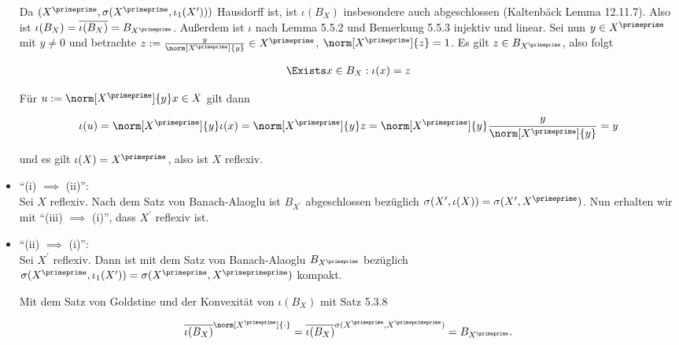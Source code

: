 \begin{solution}
\begin{itemize}

  Da $(X^\primeprime, \sigma(X^\primeprime, \iota_1(X^\prime)))$ Hausdorff ist, ist $\iota(B_X)$ insbesondere auch abgeschlossen (Kaltenbäck Lemma 12.11.7).
  Also ist $\iota(B_X) = \overline{\iota(B_X)} = B_{X^\primeprime}$.
  Außerdem ist $\iota$ nach Lemma 5.5.2 und Bemerkung 5.5.3 injektiv und linear.
  Sei nun $y \in X^\primeprime$ mit $y \neq 0$ und betrachte $z := \frac{y}{\norm[X^\primeprime]{y}} \in X^\primeprime$, $\norm[X^\primeprime]{z} = 1$.
  Es gilt $z \in B_{X^\primeprime}$, also folgt

  \begin{align*}
    \Exists x \in B_X:
    \iota(x) = z
  \end{align*}

  Für $u := \norm[X^\primeprime]{y} x \in X$ gilt dann

  \begin{align*}
    \iota(u)
    =
    \norm[X^\primeprime]{y} \iota(x)
    =
    \norm[X^\primeprime]{y} z
    =
    \norm[X^\primeprime]{y} \frac{y}{\norm[X^\primeprime]{y}}
    = y
  \end{align*}

  und es gilt $\iota(X) = X^\primeprime$, also ist $X$ reflexiv.

  \item
  \enquote{(i) $\implies$ (ii)}: \\

  Sei $X$ reflexiv.
  Nach dem Satz von Banach-Alaoglu ist $B_{X^\prime}$ abgeschlossen bezüglich $\sigma(X^\prime, \iota(X)) = \sigma(X^\prime, X^\primeprime)$.
  Nun erhalten wir mit \enquote{(iii) $\implies$ (i)}, dass $X^\prime$ reflexiv ist.

  \item
  \enquote{(ii) $\implies$ (i)}: \\

  Sei $X^\prime$ reflexiv.
  Dann ist mit dem Satz von Banach-Alaoglu $B_{X^\primeprime}$ bezüglich $\sigma(X^\primeprime, \iota_1(X^\prime)) = \sigma(X^\primeprime, X^\primeprimeprime)$ kompakt.


  Mit dem Satz von Goldstine und der Konvexität von $\iota(B_X)$ mit Satz 5.3.8

  \begin{align*}
    \overline{\iota(B_X)}^{\norm[X^\primeprime]{\cdot}}
    =
    \overline{\iota(B_X)}^{\sigma(X^\primeprime, X^\primeprimeprime)}
    =
    B_{X^\primeprime}.
  \end{align*}


\end{itemize}
\end{solution}
